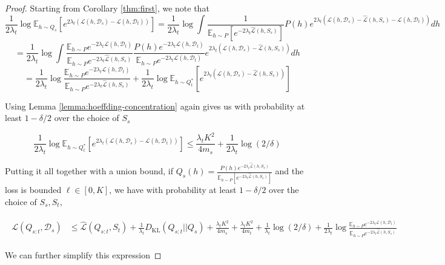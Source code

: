 \documentclass{article}
\theoremstyle{plain}
\theoremstyle{definition}
\theoremstyle{remark}
\begin{document}
\begin{proof}
    Starting from Corollary \ref{thm:first}, we note that
    $$\frac{1}{2\lambda_t}\log \mathbb{E}_{h\sim Q_{s}}\left [e^{2\lambda_t(\mathcal{L}(h,\mathcal{D}_s)-\mathcal{L}(h,\mathcal{D}_t))}\right ]=\frac{1}{2\lambda_t}\log \int \frac{1}{\mathbb{E}_{h\sim P}\left [e^{-2\lambda_t\hat{\mathcal{L}}(h,S_s)} \right ]}P(h)e^{2\lambda_t(\mathcal{L}(h,\mathcal{D}_s)-\hat{\mathcal{L}}(h,S_s)-\mathcal{L}(h,\mathcal{D}_t))}dh$$
    $$=\frac{1}{2\lambda_t}\log \int \frac{\mathbb{E}_{h\sim P} e^{-2\lambda_t\mathcal{L}(h,\mathcal{D}_t)}}{\mathbb{E}_{h\sim P} e^{-2\lambda_t\hat{\mathcal{L}}(h,S_s)}  }\frac{P(h)e^{-2\lambda_t\mathcal{L}(h,\mathcal{D}_t)}}{\mathbb{E}_{h\sim P} e^{-2\lambda_t\mathcal{L}(h,\mathcal{D}_t)}}e^{2\lambda_t(\mathcal{L}(h,\mathcal{D}_s)-\hat{\mathcal{L}}(h,S_s))}dh$$
    $$=\frac{1}{2\lambda_t}\log\frac{\mathbb{E}_{h\sim P} e^{-2\lambda_t\mathcal{L}(h,\mathcal{D}_t)}}{\mathbb{E}_{h\sim P} e^{-2\lambda_t\hat{\mathcal{L}}(h,S_s)}  }+\frac{1}{2\lambda_t}\log\mathbb{E}_{h\sim Q^{*}_t}\left [e^{2\lambda_t(\mathcal{L}(h,\mathcal{D}_s)-\hat{\mathcal{L}}(h,S_s))}\right ]$$

    Using Lemma \ref{lemma:hoeffding-concentration} again gives us with probability at least $1-\delta/2$ over the choice of $S_s$

$$\frac{1}{2\lambda_t}\log \mathbb{E}_{h\sim Q^{*}_t}\left [e^{2\lambda_t(\mathcal{L}(h,\mathcal{D}_s)-\mathcal{L}(h,\mathcal{D}_t))}\right ] \leq \frac{\lambda_t K^2}{4m_s}+\frac{1}{2\lambda_t}\log(2/\delta)$$

Putting it all together with a union bound, if $Q_s(h)=\frac{P(h)e^{-2\lambda_t\hat{\mathcal{L}}(h,S_s)}}{\mathbb{E}_{h\sim P}\left [e^{-2\lambda_t\hat{\mathcal{L}}(h,S_s)} \right ]}$ and the loss is bounded $\ell\in[0,K]$, we have with probability at least $1-\delta/2$ over the choice of $S_s,S_t$,

\begin{align}
\begin{split}
\mathcal{L}(Q_{s:t}, \mathcal{D}_s) &\leq \hat{\mathcal{L}}(Q_{s:t}, S_t) + \frac{1}{\lambda_t} D_{\mathrm{KL}}(Q_{s:t}||Q_{s})
+\frac{\lambda_t K^2}{4m_s}+\frac{\lambda_t K^2}{4m_t}+\frac{1}{\lambda_t}\log(2/\delta)+\frac{1}{2\lambda_t}\log\frac{\mathbb{E}_{h\sim P} e^{-2\lambda_t\mathcal{L}(h,\mathcal{D}_t)}}{\mathbb{E}_{h\sim P} e^{-2\lambda_t\hat{\mathcal{L}}(h,S_s)}  }
\end{split}
\end{align}

We can further simplify this expression 


\end{proof}
\end{document}
